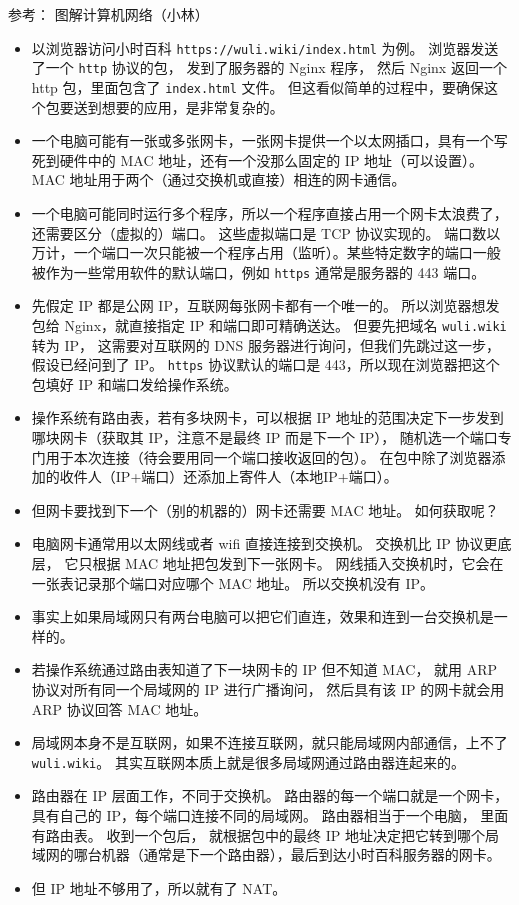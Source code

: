 
\begin{issues}
\issueDraft
\end{issues}

参考： 图解计算机网络（小林）

\begin{itemize}
\item 以浏览器访问小时百科 \verb`https://wuli.wiki/index.html` 为例。 浏览器发送了一个 \verb`http` 协议的包， 发到了服务器的 Nginx 程序， 然后 Nginx 返回一个 http 包，里面包含了 \verb`index.html` 文件。 但这看似简单的过程中，要确保这个包要送到想要的应用，是非常复杂的。
\item 一个电脑可能有一张或多张网卡，一张网卡提供一个以太网插口，具有一个写死到硬件中的 MAC 地址，还有一个没那么固定的 IP 地址（可以设置）。 MAC 地址用于两个（通过交换机或直接）相连的网卡通信。
\item 一个电脑可能同时运行多个程序，所以一个程序直接占用一个网卡太浪费了，还需要区分（虚拟的）端口。 这些虚拟端口是 TCP 协议实现的。 端口数以万计，一个端口一次只能被一个程序占用（监听）。某些特定数字的端口一般被作为一些常用软件的默认端口，例如 \verb`https` 通常是服务器的 443 端口。
\item 先假定 IP 都是公网 IP，互联网每张网卡都有一个唯一的。 所以浏览器想发包给 Nginx，就直接指定 IP 和端口即可精确送达。 但要先把域名 \verb`wuli.wiki` 转为 IP， 这需要对互联网的 DNS 服务器进行询问，但我们先跳过这一步，假设已经问到了 IP。 \verb`https` 协议默认的端口是 443，所以现在浏览器把这个包填好 IP 和端口发给操作系统。
\item 操作系统有路由表，若有多块网卡，可以根据 IP 地址的范围决定下一步发到哪块网卡（获取其 IP，注意不是最终 IP 而是下一个 IP）， 随机选一个端口专门用于本次连接（待会要用同一个端口接收返回的包）。 在包中除了浏览器添加的收件人（IP+端口）还添加上寄件人（本地IP+端口）。
\item 但网卡要找到下一个（别的机器的）网卡还需要 MAC 地址。 如何获取呢？
\item 电脑网卡通常用以太网线或者 wifi 直接连接到交换机。 交换机比 IP 协议更底层， 它只根据 MAC 地址把包发到下一张网卡。 网线插入交换机时，它会在一张表记录那个端口对应哪个 MAC 地址。 所以交换机没有 IP。
\item 事实上如果局域网只有两台电脑可以把它们直连，效果和连到一台交换机是一样的。
\item 若操作系统通过路由表知道了下一块网卡的 IP 但不知道 MAC， 就用 ARP 协议对所有同一个局域网的 IP 进行广播询问， 然后具有该 IP 的网卡就会用 ARP 协议回答 MAC 地址。
\item 局域网本身不是互联网，如果不连接互联网，就只能局域网内部通信，上不了 \verb`wuli.wiki`。 其实互联网本质上就是很多局域网通过路由器连起来的。
\item 路由器在 IP 层面工作，不同于交换机。 路由器的每一个端口就是一个网卡，具有自己的 IP，每个端口连接不同的局域网。 路由器相当于一个电脑， 里面有路由表。 收到一个包后， 就根据包中的最终 IP 地址决定把它转到哪个局域网的哪台机器（通常是下一个路由器），最后到达小时百科服务器的网卡。
\item 但 IP 地址不够用了，所以就有了 NAT。
\end{itemize}


